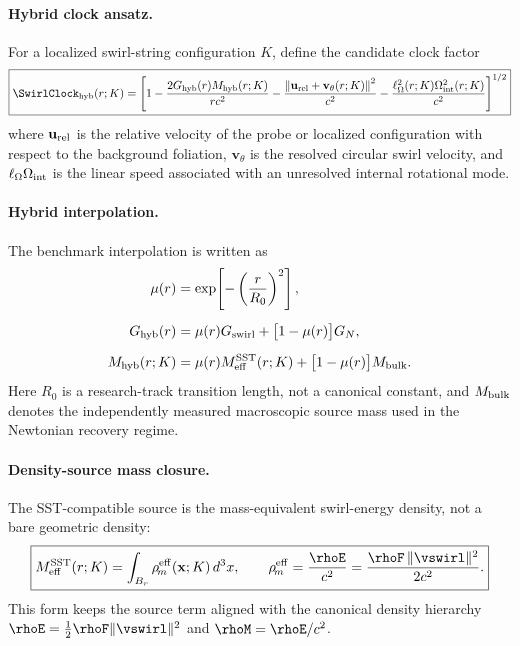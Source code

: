\paragraph{Hybrid clock ansatz.}
For a localized swirl-string configuration $K$, define the candidate clock factor
\begin{equation}
\boxed{
\SwirlClock_{\rm hyb}(r;K)
=
\left[
1
-
\frac{2G_{\rm hyb}(r)M_{\rm hyb}(r;K)}{r c^2}
-
\frac{\left\|\mathbf{u}_{\rm rel}+\mathbf{v}_{\theta}(r;K)\right\|^2}{c^2}
-
\frac{\ell_{\Omega}^{2}(r;K)\Omega_{\rm int}^{2}(r;K)}{c^2}
\right]^{1/2}
}
\label{eq:rt_hybrid_density_source_swirl_clock}
\end{equation}
where $\mathbf{u}_{\rm rel}$ is the relative velocity of the probe or localized
configuration with respect to the background foliation, $\mathbf{v}_{\theta}$ is
the resolved circular swirl velocity, and $\ell_{\Omega}\Omega_{\rm int}$ is the
linear speed associated with an unresolved internal rotational mode.

\paragraph{Hybrid interpolation.}
The benchmark interpolation is written as
\begin{align}
\mu(r) &= \exp\!\left[-\left(\frac{r}{R_0}\right)^2\right],
\label{eq:rt_hybrid_mu}\\[2mm]
G_{\rm hyb}(r)
&=
\mu(r)G_{\rm swirl}+\bigl[1-\mu(r)\bigr]G_N,
\label{eq:rt_hybrid_G}\\[2mm]
M_{\rm hyb}(r;K)
&=
\mu(r)M_{\rm eff}^{\rm SST}(r;K)
+\bigl[1-\mu(r)\bigr]M_{\rm bulk}.
\label{eq:rt_hybrid_M}
\end{align}
Here $R_0$ is a research-track transition length, not a canonical constant, and
$M_{\rm bulk}$ denotes the independently measured macroscopic source mass used
in the Newtonian recovery regime.

\paragraph{Density-source mass closure.}
The SST-compatible source is the mass-equivalent swirl-energy density, not a bare
geometric density:
\begin{equation}
\boxed{
M_{\rm eff}^{\rm SST}(r;K)
=
\int_{B_r}\rho_{\!m}^{\rm eff}(\mathbf{x};K)\,d^3x,
\qquad
\rho_{\!m}^{\rm eff}
=
\frac{\rhoE}{c^2}
=
\frac{\rhoF\,\|\vswirl\|^2}{2c^2}.
}
\label{eq:rt_density_source_mass_closure}
\end{equation}
This form keeps the source term aligned with the canonical density hierarchy
$\rhoE=\tfrac12\rhoF\|\vswirl\|^2$ and $\rhoM=\rhoE/c^2$.

